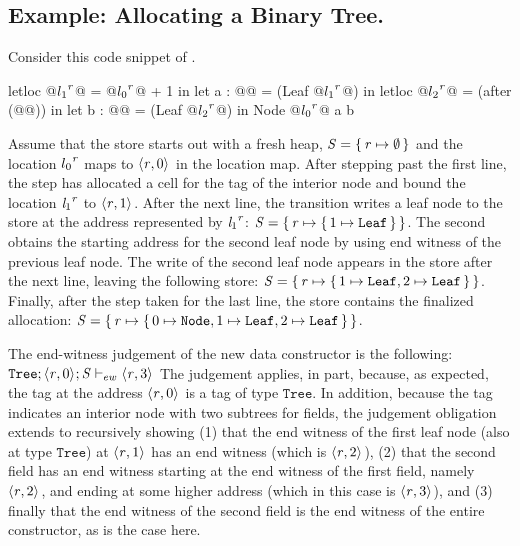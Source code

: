 \documentclass[showabstract,showacknowledgments,showpreface,showdedication]{iuphd}
\theoremstyle{nonumberplain}
\begin{document}
\subsection{Example: Allocating a Binary Tree.}
\label{sec:dynsem-example}
%
Consider this code snippet of \ourcalc{}.
%
\begin{code}
letloc @${l_1}^{\mathit{r}}$@ = @${l_0}^{\mathit{r}}$@ + 1 in
let a : @@ = (Leaf @${l_1}^{\mathit{r}}$@) in
letloc @${l_2}^{\mathit{r}}$@ = (after (@@)) in
let b : @@ = (Leaf @${l_2}^{\mathit{r}}$@) in
Node @${l_0}^{\mathit{r}}$@ a b
\end{code}
%
Assume that the store starts out with a fresh heap, $\mathit{S} = \{ \, \mathit{r}
  \mapsto \emptyset \,\}$ and the location ${l_0}^{\mathit{r}}$ maps to
$\langle \mathit{r}, 0 \rangle ^{}$ in the location map.
%
After stepping past the first line, the \textsc{\dletloctag{}} step has
allocated a cell for the tag of the interior node and bound the
location ${\mathit{l}_1}^{\mathit{r}}$ to $\langle \mathit{r}, 1 \rangle ^{}$.
%
After the next line, the \textsc{\ddatacon{}} transition writes a leaf node to
the store at the address represented by ${\mathit{l}_1}^{\mathit{r}}$:
$\mathit{S} = \{ \, \mathit{r} \mapsto \{ \, 1 \mapsto \mathtt{Leaf} \,\} \,\}$.
%
The second  obtains the starting address for the second
leaf node by using end witness of the previous leaf node.
%
The write of the second leaf node appears in the store after
the next line, leaving the following store:
$
\mathit{S} = \{ \, \mathit{r} \mapsto \{ \, 1 \mapsto \mathtt{Leaf}, 2 \mapsto \mathtt{Leaf} \,\} \,\}$.
%
Finally, after the \textsc{\ddatacon{}} step taken for the last line, the store
contains the finalized allocation:
$\mathit{S} = \{ \, \mathit{r} \mapsto \{ \, 0 \mapsto \mathtt{Node}, 1 \mapsto \mathtt{Leaf}, 2 \mapsto \mathtt{Leaf} \,\} \,\}$.
%

The end-witness judgement of the new data constructor is the
following:
$\mathtt{Tree};\langle \mathit{r}, 0 \rangle ^{};\mathit{S} \vdash_{ew} \langle \mathit{r}, 3 \rangle ^{}$
%
The judgement applies, in part, because, as expected, the tag at the
address $\langle \mathit{r}, 0 \rangle ^{}$ is a tag of type $\mathtt{Tree}$.
%
In addition, because the tag indicates an interior node with two
subtrees for fields, the judgement obligation extends to recursively
showing (1) that the end witness of the first leaf node (also at type
$\mathtt{Tree}$) at $\langle \mathit{r}, 1 \rangle ^{}$ has an end witness
(which is $\langle \mathit{r}, 2 \rangle ^{}$), (2) that the second field has an
end witness starting at the end witness of the first field, namely
$\langle \mathit{r}, 2 \rangle ^{}$, and ending at some higher address (which in
this case is $\langle \mathit{r}, 3 \rangle ^{}$), and (3) finally that the end
witness of the second field is the end witness of the entire
constructor, as is the case here.
\end{document}
